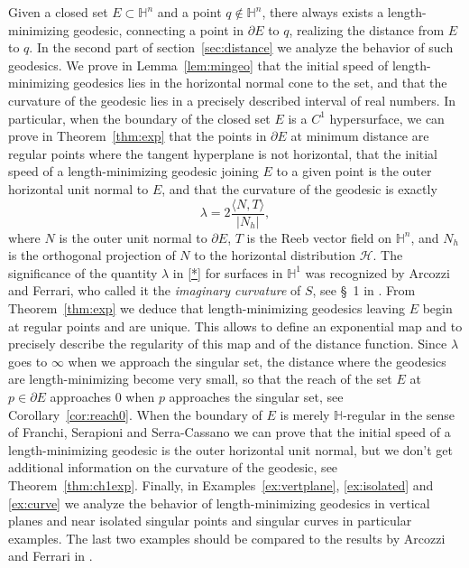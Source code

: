 \documentclass[10pt]{amsart}
\theoremstyle{definition}
\theoremstyle{remark}
\numberwithin{equation}{section}
\begin{document}
Given a closed set $E\subset{{\mathbb{H}}}^n$ and a point $q\not\in{{\mathbb{H}}}^n$, there always exists a length-minimizing  geodesic, connecting a point in ${\partial} E$ to $q$, realizing the distance from $E$ to $q$. In the second part of section~\ref{sec:distance} we analyze the behavior of such geodesics. We prove in Lemma~\ref{lem:mingeo} that the initial speed of length-minimizing geodesics lies in the horizontal normal cone to the set, and that the curvature of the geodesic lies in a precisely described interval of real numbers. In particular, when the boundary of the closed set $E$ is a $C^1$ hypersurface, we can prove in Theorem~\ref{thm:exp} that the points in ${\partial} E$ at minimum distance are regular points where the tangent hyperplane is not horizontal, that the initial speed of a length-minimizing geodesic joining $E$ to a given point is the outer horizontal unit normal to $E$, and that the curvature of the geodesic is exactly
\begin{equation}
\label{*}
\tag{*}{\lambda}=2\frac{{\langle{N,T}\rangle}}{|N_h|},
\end{equation}
where $N$ is the outer unit normal to ${\partial} E$, $T$ is the Reeb vector field on ${{\mathbb{H}}}^n$, and $N_h$ is the orthogonal projection of $N$ to the horizontal distribution ${\mathcal{H}}$. The significance of the quantity ${\lambda}$ in \eqref{*} for surfaces in ${{\mathbb{H}}}^1$ was recognized by Arcozzi and Ferrari, who called it the \emph{imaginary curvature} of $S$, see \S~1 in \cite{MR2386836}. From Theorem~\ref{thm:exp} we deduce that length-minimizing geodesics leaving $E$ begin at regular points and are unique. This allows to define an exponential map and to precisely describe the regularity of this map and of the distance function. Since ${\lambda}$ goes to $\infty$ when we approach the singular set,  the distance where the geodesics are length-minimizing become very small, so that the reach of the set $E$ at $p\in{\partial} E$ approaches $0$ when $p$ approaches the singular set, see Corollary~\ref{cor:reach0}. When the boundary of $E$ is merely ${{\mathbb{H}}}$-regular in the sense of Franchi, Serapioni and Serra-Cassano \cite{MR1871966} we can prove that the initial speed of a length-minimizing geodesic is the outer horizontal unit normal, but we don't get additional information on the curvature of the geodesic, see Theorem~\ref{thm:ch1exp}. Finally, in Examples~\ref{ex:vertplane}, \ref{ex:isolated} and \ref{ex:curve} we analyze the behavior of length-minimizing geodesics in vertical planes and near isolated singular points and singular curves in particular examples. The last two examples should be compared to the results by Arcozzi and Ferrari in \cite[\S~3]{MR2299576}.
\end{document}
